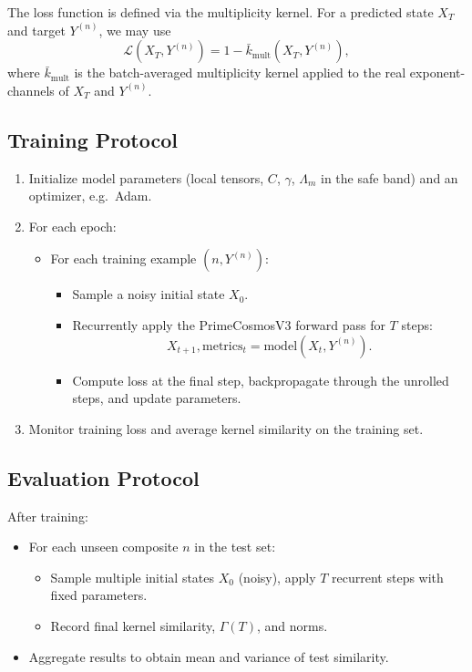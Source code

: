 \documentclass[11pt]{article}
\begin{document}
The loss function is defined via the multiplicity kernel. For a predicted state $X_T$ and target $Y^{(n)}$, we may use
\[
\mathcal{L}(X_T,Y^{(n)}) = 1 - \bar{k}_{\mathrm{mult}}(X_T,Y^{(n)}),
\]
where $\bar{k}_{\mathrm{mult}}$ is the batch-averaged multiplicity kernel applied to the real exponent-channels of $X_T$ and $Y^{(n)}$.

\subsection{Training Protocol}

\begin{enumerate}[leftmargin=1.5em]
\item Initialize model parameters (local tensors, $C$, $\gamma$, $\Lambda_m$ in the safe band) and an optimizer, e.g.\ Adam.
\item For each epoch:
\begin{itemize}[leftmargin=1em]
\item For each training example $(n, Y^{(n)})$:
\begin{itemize}[leftmargin=0.8em]
\item Sample a noisy initial state $X_0$.
\item Recurrently apply the PrimeCosmosV3 forward pass for $T$ steps:
\[
X_{t+1},\text{metrics}_t = \mathrm{model}(X_t,Y^{(n)}).
\]
\item Compute loss at the final step, backpropagate through the unrolled steps, and update parameters.
\end{itemize}
\end{itemize}
\item Monitor training loss and average kernel similarity on the training set.
\end{enumerate}

\subsection{Evaluation Protocol}

After training:

\begin{itemize}[leftmargin=1.5em]
\item For each unseen composite $n$ in the test set:
\begin{itemize}[leftmargin=0.8em]
\item Sample multiple initial states $X_0$ (noisy), apply $T$ recurrent steps with fixed parameters.
\item Record final kernel similarity, $\Gamma(T)$, and norms.
\end{itemize}
\item Aggregate results to obtain mean and variance of test similarity.
\end{itemize}
\end{document}
